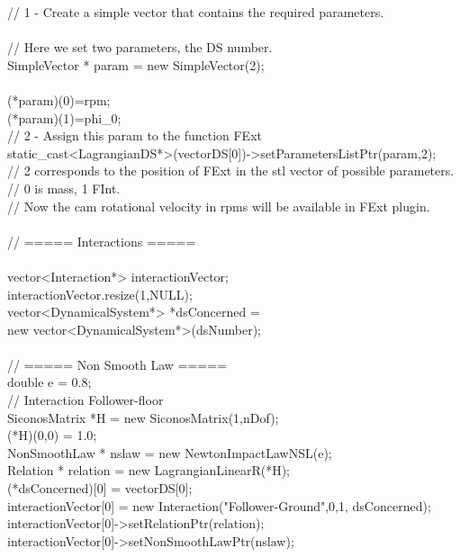 \begin{tabbing}
 \> // 1 - Create a simple vector that contains the required
 parameters.\\
\\
 \> // Here we set two parameters, the DS  number.\\
 \> SimpleVector * param = new SimpleVector(2);\\
\\
 \> (*param)(0)=rpm;\\
 \> (*param)(1)=phi\_0;\\
 \> // 2 - Assign this param to the function FExt\\
 \> static\_cast<LagrangianDS*>(vectorDS[0])->setParametersListPtr(param,2);\\
 \> // 2 corresponds to the position of FExt in the stl vector of possible parameters. \\
\> //  0 is mass, 1 FInt.\\ %
 \> // Now the cam rotational velocity in rpms will be available in FExt plugin.\\
\\
\> // ===== Interactions =====\\
\\
 \>  vector<Interaction*> interactionVector;\\
 \>  interactionVector.resize(1,NULL);\\
 \>  vector<DynamicalSystem*> *dsConcerned = \\ \>\>\> new vector<DynamicalSystem*>(dsNumber);\\
\\
 \>  // ===== Non Smooth Law =====\\
 \>  double e = 0.8;\\

 \>  // Interaction Follower-floor\\
 \>  SiconosMatrix *H = new SiconosMatrix(1,nDof);\\
 \>  (*H)(0,0) = 1.0;\\
 \>  NonSmoothLaw * nslaw = new NewtonImpactLawNSL(e);\\
 \>  Relation * relation = new LagrangianLinearR(*H);\\
 \>  (*dsConcerned)[0] = vectorDS[0];\\

 \>  interactionVector[0] = new Interaction("Follower-Ground",0,1, dsConcerned);\\
 \>  interactionVector[0]->setRelationPtr(relation);\\
 \>  interactionVector[0]->setNonSmoothLawPtr(nslaw);\\


\end{tabbing}
